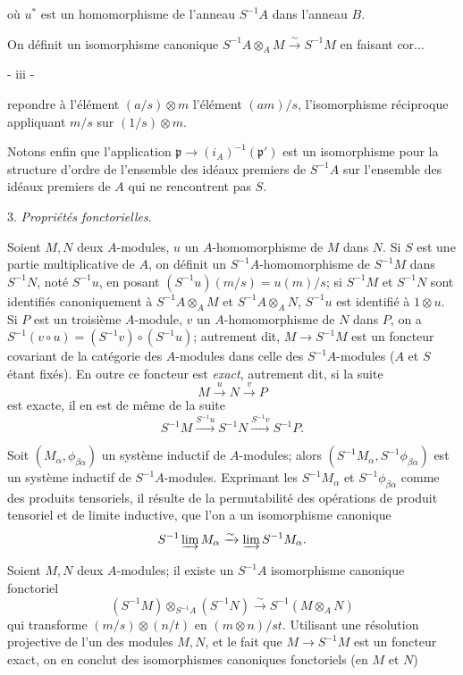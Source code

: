 où $u^*$ est un homomorphisme de l'anneau $S^{-1}A$ dans l'anneau $B$.

On définit un isomorphisme canonique $S^{-1}A \otimes_A M \xrightarrow{\sim} S^{-1}M$ en faisant cor...

\newpage


- iii -

repondre à l'élément $(a/s) \otimes m$ l'élément $(am)/s$, l'isomorphisme réciproque appliquant $m/s$ sur $(1/s) \otimes m$.

Notons enfin que l'application $\mathfrak{p} \to (i_A)^{-1}(\mathfrak{p}')$ est un isomorphisme pour la structure d'ordre de l'ensemble des idéaux premiers de $S^{-1}A$ sur l'ensemble des idéaux premiers de $A$ qui ne rencontrent pas $S$.

3. \emph{Propriétés fonctorielles}.

Soient $M, N$ deux $A$-modules, $u$ un $A$-homomorphisme de $M$ dans $N$. Si $S$ est une partie multiplicative de $A$, on définit un $S^{-1}A$-homomorphisme de $S^{-1}M$ dans $S^{-1}N$, noté $S^{-1}u$, en posant $(S^{-1}u)(m/s) = u(m)/s$; si $S^{-1}M$ et $S^{-1}N$ sont identifiés canoniquement à $S^{-1}A \otimes_A M$ et $S^{-1}A \otimes_A N$, $S^{-1}u$ est identifié à $1 \otimes u$. Si $P$ est un troisième $A$-module, $v$ un $A$-homomorphisme de $N$ dans $P$, on a $S^{-1}(v \circ u) = (S^{-1}v) \circ (S^{-1}u)$; autrement dit, $M \to S^{-1}M$ est un foncteur covariant de la catégorie des $A$-modules dans celle des $S^{-1}A$-modules ($A$ et $S$ étant fixés). En outre ce foncteur est \emph{exact}, autrement dit, si la suite
$$M \xrightarrow{u} N \xrightarrow{v} P$$
est exacte, il en est de même de la suite
$$S^{-1}M \xrightarrow{S^{-1}u} S^{-1}N \xrightarrow{S^{-1}v} S^{-1}P.$$

Soit $(M_\alpha, \phi_{\beta\alpha})$ un système inductif de $A$-modules; alors $(S^{-1}M_\alpha, S^{-1}\phi_{\beta\alpha})$ est un système inductif de $S^{-1}A$-modules. Exprimant les $S^{-1}M_\alpha$ et $S^{-1}\phi_{\beta\alpha}$ comme des produits tensoriels, il résulte de la permutabilité des opérations de produit tensoriel et de limite inductive, que l'on a un isomorphisme canonique
$$S^{-1} \varinjlim M_\alpha \xrightarrow{\sim} \varinjlim S^{-1}M_\alpha.$$

Soient $M, N$ deux $A$-modules; il existe un $S^{-1}A$ isomorphisme canonique fonctoriel
$$(S^{-1}M) \otimes_{S^{-1}A} (S^{-1}N) \xrightarrow{\sim} S^{-1}(M \otimes_A N)$$
qui transforme $(m/s) \otimes (n/t)$ en $(m \otimes n)/st$. Utilisant une résolution projective de l'un des modules $M, N$, et le fait que $M \to S^{-1}M$ est un foncteur exact, on en conclut des isomorphismes canoniques fonctoriels (en $M$ et $N$)

